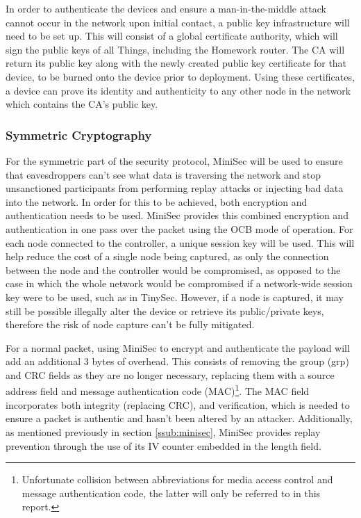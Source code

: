 \documentclass{mprop}
\begin{document}
In order to authenticate the devices and ensure a man-in-the-middle attack cannot occur in the network upon initial contact, a public key infrastructure will need to be set up. This will consist of a global certificate authority, which will sign the public keys of all Things, including the Homework router. The CA will return its public key along with the newly created public key certificate for that device, to be burned onto the device prior to deployment. Using these certificates, a device can prove its identity and authenticity to any other node in the network which contains the CA's public key. 

\subsubsection{Symmetric Cryptography} %
\label{ssub:symmetric_key_cryptography}
For the symmetric part of the security protocol, MiniSec\cite{MiniSec} will be used to ensure that eavesdroppers can't see what data is traversing the network and stop unsanctioned participants from performing replay attacks or injecting bad data into the network. In order for this to be achieved, both encryption and authentication needs to be used. MiniSec provides this combined encryption and authentication in one pass over the packet using the OCB mode of operation. For each node connected to the controller, a unique session key will be used. This will help reduce the cost of a single node being captured, as only the connection between the node and the controller would be compromised, as opposed to the case in which the whole network would be compromised if a network-wide session key were to be used, such as in TinySec\cite{TinySec}. However, if a node is captured, it may still be possible illegally alter the device or retrieve its public/private keys, therefore the risk of node capture can't be fully mitigated.

For a normal packet, using MiniSec to encrypt and authenticate the payload will add an additional 3 bytes of overhead. This consists of removing the group (grp) and CRC fields as they are no longer necessary, replacing them with a source address field and message authentication code (MAC)\footnote{Unfortunate collision between abbreviations for media access control and message authentication code, the latter will only be referred to in this report.}. The MAC field incorporates both integrity (replacing CRC), and verification, which is needed to ensure a packet is authentic and hasn't been altered by an attacker. Additionally, as mentioned previously in section \ref{ssub:minisec}, MiniSec provides replay prevention through the use of its IV counter embedded in the length field.
\end{document}
